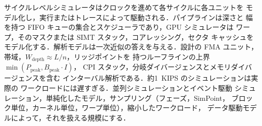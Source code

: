 \documentclass[../main.tex]{subfiles}
\begin{document}
\begin{keypoint}[章のまとめ]
  サイクルレベルシミュレータはクロックを進めて各サイクルに各ユニットを
  モデル化し，実行またはトレースによって駆動される．パイプラインは深さと
  幅を持つ FIFO キューの集合とスケジューラであり，GPU シミュレータは
  ワープ，そのマスクまたは SIMT スタック，コアレッシング，セクタ
  キャッシュをモデル化する．解析モデルは一次近似の答えを与える．設計の
  FMA ユニット，帯域，$W_{\text{depth}} \approx L/n$，リッジポイントを
  持つルーフラインの上界 $\min(P_{\text{peak}}, B_{\text{peak}} \cdot I)$，
  CPI スタック，分岐ダイバージェンスとメモリダイバージェンスを含む
  インターバル解析である．約1~KIPS のシミュレーションは実際の
  ワークロードには遅すぎる．並列シミュレーションとイベント駆動
  シミュレーション，単純化したモデル，サンプリング（フェーズ，SimPoint，
  ブロック単位，カーネル単位，ワープ単位），縮小したワークロード，
  データ駆動モデルによって，それを扱える規模にする．
\end{keypoint}
\end{document}
